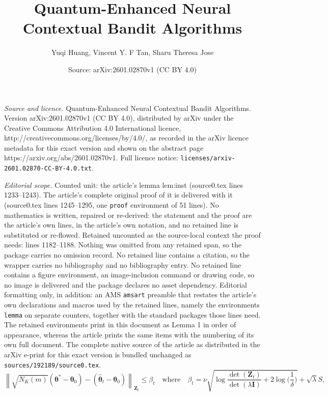 \documentclass[10pt,a4paper]{amsart}
\title{Quantum-Enhanced Neural Contextual Bandit Algorithms}
\author{Yuqi Huang, Vincent Y. F Tan, Sharu Theresa Jose}
\date{Source: arXiv:2601.02870v1 (CC BY 4.0)}
\newcommand{\Ibf}{\mathbf{I}}
\newcommand{\Zbf}{\mathbf{Z}}
\newcommand{\norm}[1]{\left\lVert#1\right\rVert}
\newcommand{\thetabf}{\bm{\theta}}
\begin{document}
\maketitle

\noindent\emph{Source and licence.} Quantum-Enhanced Neural Contextual Bandit Algorithms. Version arXiv:2601.02870v1 (CC BY 4.0), distributed by arXiv under the Creative Commons Attribution 4.0 International licence, http://creativecommons.org/licenses/by/4.0/, as recorded in the arXiv licence metadata for this exact version and shown on the abstract page https://arxiv.org/abs/2601.02870v1. Full licence notice: \texttt{licenses/arxiv-2601.02870-CC-BY-4.0.txt}.\par\smallskip

\noindent\textit{Editorial scope.} Counted unit: the article's lemma lem:inst (source0.tex lines 1233--1243). The article's complete original proof of it is delivered with it (source0.tex lines 1245--1295, one \texttt{proof} environment of 51 lines). No mathematics is written, repaired or re-derived: the statement and the proof are the article's own lines, in the article's own notation, and no retained line is substituted or re-flowed.  Retained uncounted as the source-local context the proof needs: lines 1182--1188.  Nothing was omitted from any retained span, so the package carries no omission record.  No retained line contains a citation, so the wrapper carries no bibliography and no bibliography entry.  No retained line contains a figure environment, an image-inclusion command or drawing code, so no image is delivered and the package declares no asset dependency.  Editorial formatting only, in addition: an AMS \texttt{amsart} preamble that restates the article's own declarations and macros used by the retained lines, namely the environments \texttt{lemma} on separate counters, together with the standard packages those lines need.  The retained environments print in this document as Lemma 1 in order of appearance, whereas the article prints the same items with the numbering of its own full document.  The complete native source of the article as distributed in the arXiv e-print for this exact version is bundled unchanged as \texttt{sources/192189/source0.tex}.
\begin{equation}
\label{eq:conf}
\norm{\sqrt{N_K(m)}({\thetabf}^* - {\thetabf}_0)-(\hat{\thetabf}_t-\thetabf_0)}_{\Zbf_t}  \leq \beta_t
\quad\mbox{where}\quad
\beta_{t} = \nu\sqrt{\log\frac{\det(\Zbf_{t})}{\det(\lambda \Ibf)} + 2\log\Big(\frac{1}{\delta}\Big)}
+\sqrt{\lambda}S,
\end{equation}
\end{document}
